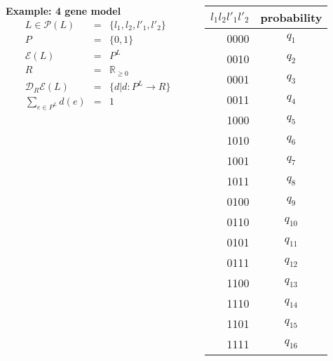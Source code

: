 \begin{frame}
\begin{columns}[c]
\begin{column}{0.5\textwidth}
\begin{block}{\textbf{Example: 4 gene model}}
\begin{eqnarray*}
L \in \mathcal{P}(L) &=& \{l_1,l_2,l'_1,l'_2\}\\
P &=& \{0,1\}\\
\mathcal{E}(L) &=& P^L\\
R &=& \mathbb{R}_{\geq 0}\\
\mathcal{D}_R \mathcal{E}(L) &=& \{d | d \colon P^L \rightarrow R \}\\
\sum_{e \in P^L} d(e) &=& 1
\end{eqnarray*}
\end{block}
\end{column}
\begin{column}{0.5\textwidth}
\begin{table}
\centering
\begin{tabular}{ r || c }
$l_1 l_2 l'_1 l'_2$ & probability \\ \hline
0000 & $q_1$ \\
0010 & $q_2$ \\
0001 & $q_3$ \\
0011 & $q_4$ \\
1000 & $q_5$ \\
1010 & $q_6$ \\
1001 & $q_7$ \\
1011 & $q_8$ \\
0100 & $q_9$ \\
0110 & $q_{10}$ \\
0101 & $q_{11}$ \\
0111 & $q_{12}$ \\
1100 & $q_{13}$ \\
1110 & $q_{14}$ \\
1101 & $q_{15}$ \\
1111 & $q_{16}$
\end{tabular}
\end{table}
\end{column}
\end{columns}
\end{frame}

